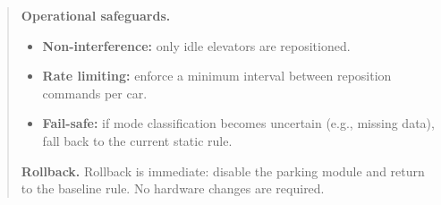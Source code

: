 \begin{quote}
\vspace{0.6em}
\textbf{Operational safeguards.}
\begin{itemize}[leftmargin=1.2em,itemsep=0.25em,topsep=0.25em]
  \item \textbf{Non-interference:} only idle elevators are repositioned.
  \item \textbf{Rate limiting:} enforce a minimum interval between reposition commands per car.
  \item \textbf{Fail-safe:} if mode classification becomes uncertain (e.g., missing data), fall back to the current static rule.
\end{itemize}

\vspace{0.6em}
\textbf{Rollback.}
Rollback is immediate: disable the parking module and return to the baseline rule. No hardware changes are required.
\end{quote}
